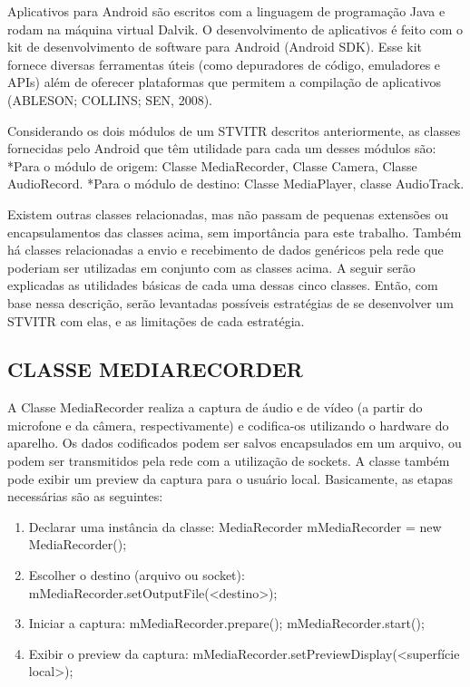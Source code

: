 \documentclass{acm_proc_article-sp}
\begin{document}
Aplicativos para Android são escritos com a linguagem de programação Java e rodam na máquina virtual Dalvik. O desenvolvimento de aplicativos é feito com o kit de desenvolvimento de software para Android (Android SDK). Esse kit fornece diversas ferramentas úteis (como depuradores de código, emuladores e APIs) além de oferecer plataformas que permitem a compilação de aplicativos (ABLESON; COLLINS; SEN, 2008).

Considerando os dois módulos de um STVITR descritos anteriormente, as classes fornecidas pelo Android que têm utilidade para cada um desses módulos são:
*Para o módulo de origem: Classe MediaRecorder, Classe Camera, Classe AudioRecord.
*Para o módulo de destino: Classe MediaPlayer, classe AudioTrack.

Existem outras classes relacionadas, mas não passam de pequenas extensões ou encapsulamentos das classes acima, sem importância para este trabalho. Também há classes relacionadas a envio e recebimento de dados genéricos pela rede que poderiam ser utilizadas em conjunto com as classes acima. A seguir serão explicadas as utilidades básicas de cada uma dessas cinco classes. Então, com base nessa descrição, serão levantadas possíveis estratégias de se desenvolver um STVITR com elas, e as limitações de cada estratégia.

\subsection{CLASSE MEDIARECORDER}
A Classe MediaRecorder realiza a captura de áudio e de vídeo (a partir do microfone e da câmera, respectivamente) e codifica-os utilizando o hardware do aparelho. Os dados codificados podem ser salvos encapsulados em um arquivo, ou podem ser transmitidos pela rede com a utilização de sockets. A classe também pode exibir um preview da captura para o usuário local.
Basicamente, as etapas necessárias são as seguintes:
\begin{enumerate}
 \item Declarar uma instância da classe:
MediaRecorder mMediaRecorder = new MediaRecorder();
 \item Escolher o destino (arquivo ou socket):
mMediaRecorder.setOutputFile(<destino>);
 \item Iniciar a captura:
mMediaRecorder.prepare();
mMediaRecorder.start();
 \item Exibir o preview da captura:
mMediaRecorder.setPreviewDisplay(<superfície local>);
\end{enumerate}
\end{document}
